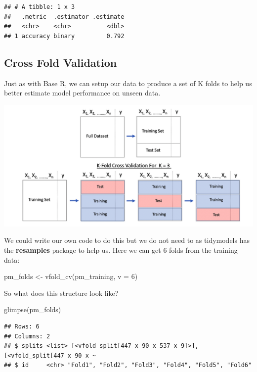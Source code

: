 \documentclass[
]{article}
\newenvironment{Shaded}{\begin{snugshade}}{\end{snugshade}}
\newcommand{\AttributeTok}[1]{\textcolor[rgb]{0.77,0.63,0.00}{#1}}
\newcommand{\DecValTok}[1]{\textcolor[rgb]{0.00,0.00,0.81}{#1}}
\newcommand{\FunctionTok}[1]{\textcolor[rgb]{0.00,0.00,0.00}{#1}}
\newcommand{\NormalTok}[1]{#1}
\newcommand{\OtherTok}[1]{\textcolor[rgb]{0.56,0.35,0.01}{#1}}
\begin{document}
\begin{verbatim}
## # A tibble: 1 x 3
##   .metric  .estimator .estimate
##   <chr>    <chr>          <dbl>
## 1 accuracy binary         0.792
\end{verbatim}

\hypertarget{cross-fold-validation-1}{%
\subsection{Cross Fold Validation}\label{cross-fold-validation-1}}

Just as with Base R, we can setup our data to produce a set of K folds
to help us better estimate model performance on unseen data.

\includegraphics[width=1.2\textwidth,height=\textheight]{./IMG/crossfold.png}

We could write our own code to do this but we do not need to as
tidymodels has the \textbf{resamples} package to help us. Here we can
get 6 folds from the training data:

\begin{Shaded}
\begin{Highlighting}[]
\NormalTok{pm\_folds }\OtherTok{\textless{}{-}} \FunctionTok{vfold\_cv}\NormalTok{(pm\_training, }\AttributeTok{v =} \DecValTok{6}\NormalTok{)}
\end{Highlighting}
\end{Shaded}

So what does this structure look like?

\begin{Shaded}
\begin{Highlighting}[]
\FunctionTok{glimpse}\NormalTok{(pm\_folds)}
\end{Highlighting}
\end{Shaded}

\begin{verbatim}
## Rows: 6
## Columns: 2
## $ splits <list> [<vfold_split[447 x 90 x 537 x 9]>], [<vfold_split[447 x 90 x ~
## $ id     <chr> "Fold1", "Fold2", "Fold3", "Fold4", "Fold5", "Fold6"
\end{verbatim}
\end{document}
